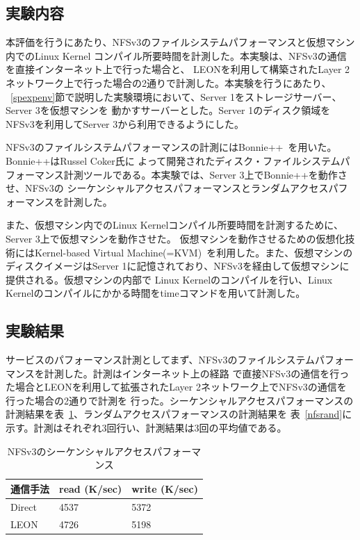 \subsection{実験内容}

本評価を行うにあたり、NFSv3のファイルシステムパフォーマンスと仮想マシン内でのLinux Kernel
コンパイル所要時間を計測した。本実験は、NFSv3の通信を直接インターネット上で行った場合と、
LEONを利用して構築されたLayer 2ネットワーク上で行った場合の2通りで計測した。本実験を行うにあたり、
~\ref{spexpenv}節で説明した実験環境において、Server 1をストレージサーバー、Server 3を仮想マシンを
動かすサーバーとした。Server 1のディスク領域をNFSv3を利用してServer 3から利用できるようにした。

NFSv3のファイルシステムパフォーマンスの計測にはBonnie++~\cite{bonnieplusplus}を用いた。Bonnie++はRussel Coker氏に
よって開発されたディスク・ファイルシステムパフォーマンス計測ツールである。本実験では、Server 3上でBonnie++を動作させ、NFSv3の
シーケンシャルアクセスパフォーマンスとランダムアクセスパフォーマンスを計測した。

また、仮想マシン内でのLinux Kernelコンパイル所要時間を計測するために、Server 3上で仮想マシンを動作させた。
仮想マシンを動作させるための仮想化技術にはKernel-based Virtual Machine(=KVM)~\cite{kvm}を利用した。また、仮想マシンの
ディスクイメージはServer 1に記憶されており、NFSv3を経由して仮想マシンに提供される。仮想マシンの内部で
Linux Kernelのコンパイルを行い、Linux Kernelのコンパイルにかかる時間をtimeコマンドを用いて計測した。

\subsection{実験結果}
\label{spexpres}

サービスのパフォーマンス計測としてまず、NFSv3のファイルシステムパフォーマンスを計測した。計測はインターネット上の経路
で直接NFSv3の通信を行った場合とLEONを利用して拡張されたLayer 2ネットワーク上でNFSv3の通信を行った場合の2通りで計測を
行った。シーケンシャルアクセスパフォーマンスの計測結果を表~\ref{nfsseq}、ランダムアクセスパフォーマンスの計測結果を
表~\ref{nfsrand}に示す。計測はそれぞれ3回行い、計測結果は3回の平均値である。

\begin{table}[h]
        \begin{center}
                \caption{NFSv3のシーケンシャルアクセスパフォーマンス}
                \begin{tabular}{|l|l|l|}
                        \hline
                                通信手法 & read (K/sec) & write (K/sec) \\
                        \hline
			\hline
                                Direct & 4537 & 5372 \\
			\hline
				LEON & 4726 & 5198 \\
                        \hline
                \end{tabular}
                \label{nfsseq}
        \end{center}
\end{table}

